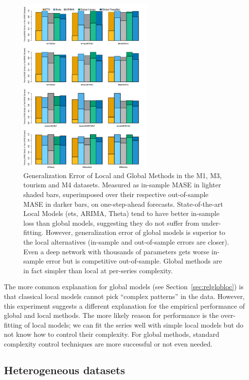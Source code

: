 \documentclass[a4paper]{article}
\theoremstyle{custom}
\begin{document}
\begin{figure}
  \centering
  \includegraphics[width=0.6\textwidth]{fig/invsout.pdf}
  \caption{Generalization Error of Local and Global Methods in the M1, M3, tourism and M4 datasets. Measured as in-sample MASE in lighter shaded bars, superimposed over their respective out-of-sample MASE in darker bars, on one-step-ahead forecasts.
  State-of-the-art Local Models (ets, ARIMA, Theta) tend to have better in-sample loss than global models, suggesting they do not suffer from under-fitting. However, generalization error of global models is superior to the local alternatives (in-sample and out-of-sample errors are closer). Even a deep network with thousands of parameters gets worse in-sample error but is competitive out-of-sample. Global methods are in fact simpler than local at per-series complexity.}
  \label{fig:invsout}
\end{figure}

The more common explanation for global models (see Section~\ref{sec:relglobloc}) is that classical local models cannot pick ``complex patterns'' in the data. However, this experiment suggests a different explanation for the empirical performance of global and local methods. The more likely reason for performance is the over-fitting of local models; we can fit the series well with simple local models but do not know how to control their complexity. For global methods, standard complexity control techniques are more successful or not even needed.

\subsection{Heterogeneous datasets}
\label{sec:heterogexp}
\end{document}
